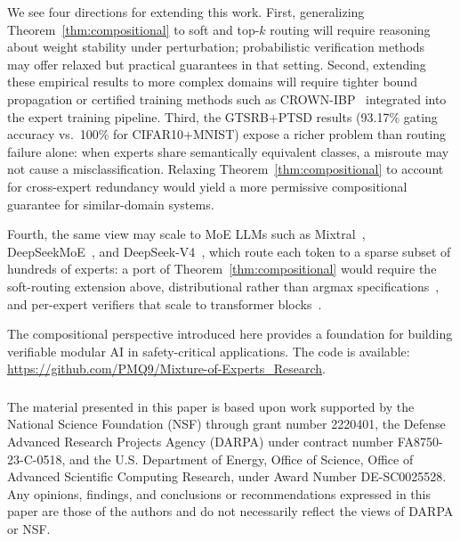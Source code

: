 \documentclass[runningheads]{llncs}
\begin{document}
We see four directions for extending this work. First, generalizing Theorem~\ref{thm:compositional} to soft and top-$k$ routing will require reasoning about weight stability under perturbation; probabilistic verification methods~\cite{chwialkowski2025probabilistic} may offer relaxed but practical guarantees in that setting. Second, extending these empirical results to more complex domains will require tighter bound propagation or certified training methods such as CROWN-IBP~\cite{zhang2020} integrated into the expert training pipeline. Third, the GTSRB+PTSD results (93.17\% gating accuracy vs.\ 100\% for CIFAR10+MNIST) expose a richer problem than routing failure alone: when experts share semantically equivalent classes, a misroute may not cause a misclassification. Relaxing Theorem~\ref{thm:compositional} to account for cross-expert redundancy would yield a more permissive compositional guarantee for similar-domain systems. 

Fourth, the same view may scale to MoE LLMs such as Mixtral~\cite{jiang2024}, DeepSeekMoE~\cite{dai2024}, and DeepSeek-V4~\cite{deepseekv4}, which route each token to a sparse subset of hundreds of experts: a port of Theorem~\ref{thm:compositional} would require the soft-routing extension above, distributional rather than argmax specifications~\cite{casadio2022,chwialkowski2025probabilistic}, and per-expert verifiers that scale to transformer blocks~\cite{kaulen2025}.

The compositional perspective introduced here provides a foundation for building verifiable modular AI in safety-critical applications. The code is available: \url{https://github.com/PMQ9/Mixture-of-Experts_Research}.

\newpage
\begin{credits}
\subsubsection{\ackname}
The material presented in this paper is based upon work supported by the National Science Foundation (NSF) through grant number 2220401, the Defense Advanced Research Projects Agency (DARPA) under contract number FA8750-23-C-0518, and the U.S. Department of Energy, Office of Science, Office of Advanced Scientific Computing Research, under Award Number DE-SC0025528. Any opinions, findings, and conclusions or recommendations expressed in this paper are those of the authors and do not necessarily reflect the views of DARPA or NSF.
\end{credits}
\end{document}
